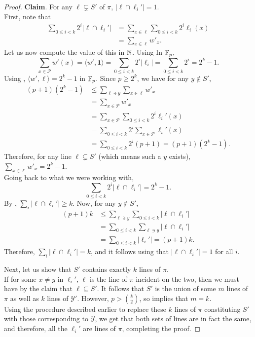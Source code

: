 \begin{proof}
		\textbf{Claim}. For any $\ell\subsetneq S'$ of $\pi$, $|\ell \cap \ell_i'| = 1$.\\
		First, note that
		\begin{align*}
			\sum_{0 \le i < k} 2^i |\ell \cap \ell_i'| &= \sum_{x \in \ell} \sum_{0 \le i < k} 2^i \ell_i(x) \\
				&= \sum_{x \in \ell} w'_x.
		\end{align*}
		Let us now compute the value of this in $\mathbb{N}$. Using  In $\mathbb{F}_p$,
		\[ \sum_{x \in \mathcal{P}} w'(x) = \langle w', \textbf{1} \rangle = \sum_{0 \le i < k} 2^i |\ell_i| = \sum_{0 \le i < k} 2^i = 2^k - 1. \]
		Using , $\langle w', \ell \rangle = 2^k - 1$ in $\mathbb{F}_p$.
		Since $p \ge 2^k$, we have for any $y \not\in S'$,
		\begin{align*}
			(p+1)(2^k-1) &\le \sum_{\ell \ni y} \sum_{x \in \ell} w'_x	\\
				&= \sum_{x \in \mathcal{P}} w'_x \\
				&= \sum_{x \in \mathcal{P}} \sum_{0 \le i < k} 2^i \ell_i'(x) \\
				&= \sum_{0 \le i < k} 2^i \sum_{x \in \mathcal{P}} \ell_i'(x) \\
				&= \sum_{0 \le i < k} 2^i (p+1) = (p+1)(2^k-1).
		\end{align*}
		Therefore, for any line $\ell \subsetneq S'$ (which means such a $y$ exists), $\sum_{x \in \ell} w'_x = 2^k-1$.\\
		Going back to what we were working with,
		\[ \sum_{0 \le i < k} 2^i |\ell \cap \ell_i'| = 2^k - 1. \]
		By , $\sum_i |\ell \cap \ell_i'| \ge k$. Now, for any $y \not\in S'$,
		\begin{align*}
			(p+1)k &\le \sum_{\ell \ni y} \sum_{0 \le i < k} |\ell \cap \ell_i'| \\
				&= \sum_{0 \le i < k} \sum_{\ell \ni y} |\ell \cap \ell_i'| \\
				&= \sum_{0 \le i < k} |\ell_i'| = (p+1)k.
		\end{align*}
		Therefore, $\sum_i |\ell \cap \ell_i'| = k$, and it follows using  that $|\ell \cap \ell_i'| = 1$ for all $i$. \qedwhite

		Next, let us show that $S'$ contains exactly $k$ lines of $\pi$.\\
		If for some $x \ne y$ in $\ell_i'$, $\ell$ is the line of $\pi$ incident on the two, then we must have by the claim that $\ell \subseteq S'$. It follows that $S'$ is the union of some $m$ lines of $\pi$ as well as $k$ lines of $\mathcal{Y}'$. However, $p > \binom{k}{2}$, so  implies that $m = k$.\\

		Using the procedure described earlier to replace these $k$ lines of $\pi$ constituting $S'$ with those corresponding to $\mathcal{Y}$, we get that both sets of lines are in fact the same, and therefore, all the $\ell_i'$ are lines of $\pi$, completing the proof.
	\end{proof}
	
